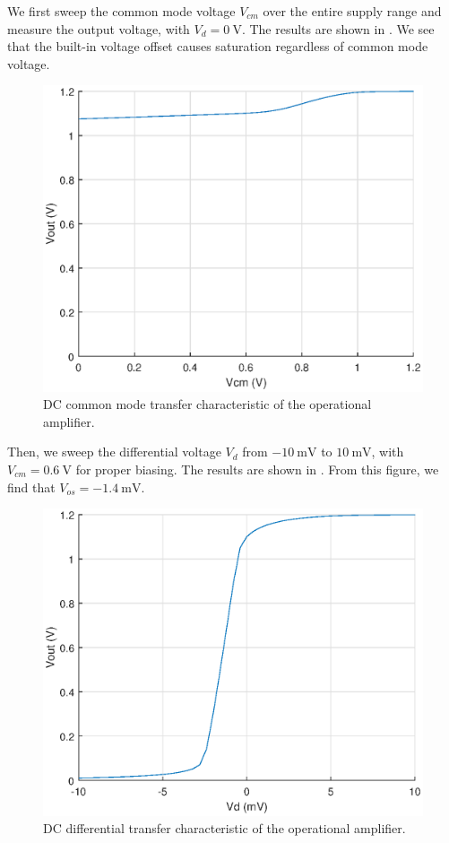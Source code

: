 \documentclass[journal,hidelinks]{IEEEtran}
\begin{document}
We first sweep the common mode voltage $V_{cm}$ over the entire supply range and measure the output voltage, with $V_d = \SI{0}{\volt}$. The results are shown in . We see that the built-in voltage offset causes saturation regardless of common mode voltage.

\begin{figure}[!htb]
  \centering
  \includegraphics[width=\columnwidth]{dc_cm.eps}
  \caption{DC common mode transfer characteristic of the operational amplifier.}
  \label{fig:dc_cm}
\end{figure}

Then, we sweep the differential voltage $V_d$ from $\SI{-10}{\milli\volt}$ to $\SI{10}{\milli\volt}$, with $V_{cm} = \SI{0.6}{\volt}$ for proper biasing. The results are shown in . From this figure, we find that $V_{os} = \SI{-1.4}{\milli\volt}$.

\begin{figure}[!htb]
  \centering
  \includegraphics[width=\columnwidth]{dc_dm.eps}
  \caption{DC differential transfer characteristic of the operational amplifier.}
  \label{fig:dc_dm}
\end{figure}
\end{document}

